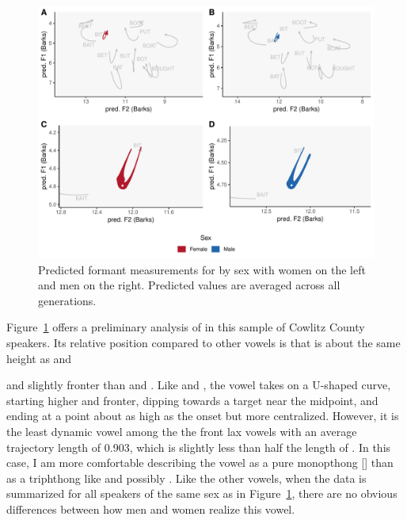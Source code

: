 \begin{figure}[tb!]
	\centering
	\includegraphics[width = 6.5in]{Figures/BIT/BIT_four_panel_plot_summarized.pdf}
	\caption[Predicted formant measurements for \bit by sex.]{Predicted formant measurements for \bit by sex with women on the left and men on the right. Predicted values are averaged across all generations.}
	\label{fig:BIT_four_panel_summarized}
\end{figure}

Figure~\ref{fig:BIT_four_panel_summarized} offers a preliminary analysis of \bit in this sample of Cowlitz County speakers. Its relative position compared to other vowels is that is about the same height as \face and \strut and slightly fronter than \bet and \bat. Like \bat and \bet, the \bit vowel takes on a U-shaped curve, starting higher and fronter, dipping towards a target near the midpoint, and ending at a point about as high as the onset but more centralized. However, it is the least dynamic vowel among the the front lax vowels with an average trajectory length of 0.903, which is slightly less than half the length of \bat. In this case, I am more comfortable describing the vowel as a pure monopthong [] than as a triphthong like \bat and possibly \bet. Like the other vowels, when the data is summarized for all speakers of the same sex as in Figure~\ref{fig:BIT_four_panel_summarized}, there are no obvious differences between how men and women realize this vowel.

